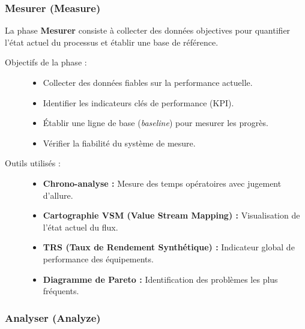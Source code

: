 \documentclass[a4paper,12pt]{article}
\begin{document}
\subsubsection{Mesurer (Measure)}

La phase \textbf{Mesurer} consiste à collecter des données objectives pour quantifier l'état actuel du processus et établir une base de référence.

\begin{description}
    \item[Objectifs de la phase :]
    \begin{itemize}
        \item Collecter des données fiables sur la performance actuelle.
        \item Identifier les indicateurs clés de performance (KPI).
        \item Établir une ligne de base (\textit{baseline}) pour mesurer les progrès.
        \item Vérifier la fiabilité du système de mesure.
    \end{itemize}
    
    \item[Outils utilisés :]
    \begin{itemize}
        \item \textbf{Chrono-analyse :} Mesure des temps opératoires avec jugement d'allure.
        \item \textbf{Cartographie VSM (Value Stream Mapping) :} Visualisation de l'état actuel du flux.
        \item \textbf{TRS (Taux de Rendement Synthétique) :} Indicateur global de performance des équipements.
        \item \textbf{Diagramme de Pareto :} Identification des problèmes les plus fréquents.
    \end{itemize}
\end{description}

\begin{center}
\end{center}

\subsubsection{Analyser (Analyze)}
\end{document}
